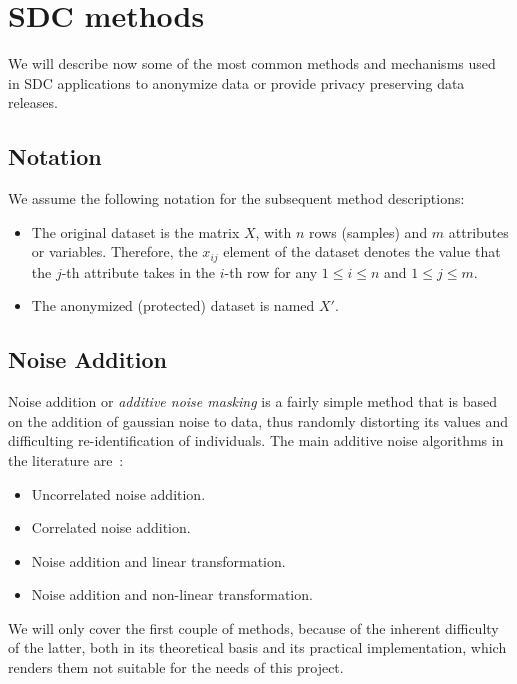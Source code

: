 \section{SDC methods}
\label{Theory:SDCMethods}

We will describe now some of the most common methods and mechanisms used in SDC applications to anonymize data or provide privacy preserving data releases.

\subsection*{Notation}

We assume the following notation for the subsequent method descriptions:

\begin{itemize}
	\item
	The original dataset is the matrix $X$, with $n$ rows (samples) and $m$ attributes or variables. Therefore, the $x_{ij}$ element of the dataset denotes the value that the $j$-th attribute takes in the $i$-th row for any $1 \leq i \leq n$ and $1 \leq j \leq m$.
	
	\item
	The anonymized (protected) dataset is named $X'$.
\end{itemize}

\subsection{Noise Addition}
\label{Theory:SDCMethods:NoiseAddition}

Noise addition or \textit{additive noise masking} is a fairly simple method that is based on the addition of gaussian noise to data, thus randomly distorting its values and difficulting re-identification of individuals. The main additive noise algorithms in the literature are~\citep[p. 54]{Hundepool:StatisticalDisclosureControl}:

\begin{itemize}
	\item
	Uncorrelated noise addition.
	\item
	Correlated noise addition.
	\item
	Noise addition and linear transformation.
	\item
	Noise addition and non-linear transformation.
\end{itemize}

We will only cover the first couple of methods, because of the inherent difficulty of the latter, both in its theoretical basis and its practical implementation, which renders them not suitable for the needs of this project.

